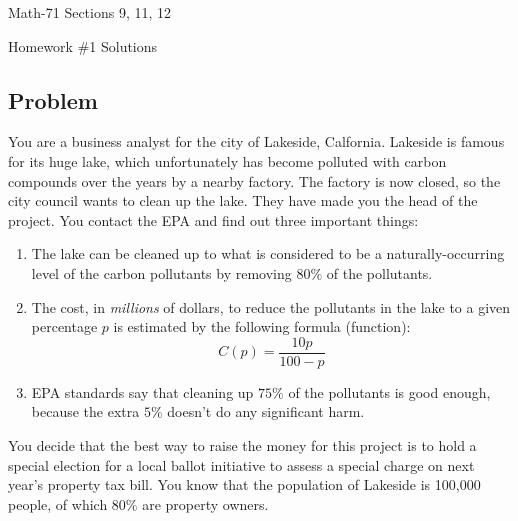 \documentclass[letterpaper,12pt,fleqn]{article}
\begin{document}
\begin{center}
  \large
  Math-71 Sections 9, 11, 12

  \Large
  Homework \#1 Solutions
\end{center}

\subsection*{Problem}

You are a business analyst for the city of Lakeside, Calfornia.  Lakeside is famous for its huge lake, which unfortunately
has become polluted with carbon compounds over the years by a nearby factory.  The factory is now closed, so the city
council wants to clean up the lake.  They have made you the head of the project.  You contact the EPA and find out three
important things:
\begin{enumerate}
\item The lake can be cleaned up to what is considered to be a naturally-occurring level of the carbon pollutants
  by removing \(80\%\) of the pollutants.
\item The cost, in \emph{millions} of dollars, to reduce the pollutants in the lake to a given percentage \(p\) is estimated
  by the following formula (function):
  \[C(p)=\frac{10p}{100-p}\]
\item EPA standards say that cleaning up \(75\%\) of the pollutants is good enough, because the extra \(5\%\) doesn't do any
  significant harm.
\end{enumerate}
You decide that the best way to raise the money for this project is to hold a special election for a local ballot initiative to
assess a special charge on next year's property tax bill.  You know that the population of Lakeside is 100,000 people, of
which \(80\%\) are property owners.
\end{document}
